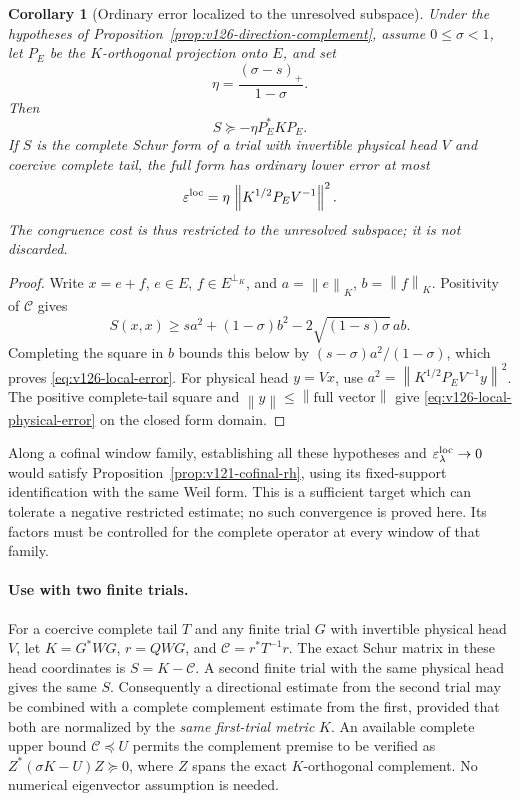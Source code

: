 \documentclass[11pt]{article}
\newtheorem{corollary}[theorem]{Corollary}
\theoremstyle{remark}
\newcommand{\norm}[1]{\left\lVert #1\right\rVert}
\begin{document}
\begin{corollary}[Ordinary error localized to the unresolved subspace]
\label{cor:v126-local-error}
Under the hypotheses of Proposition~\ref{prop:v126-direction-complement},
assume $0\le\sigma<1$, let $P_E$ be the $K$-orthogonal projection
onto $E$, and set
\[
 \eta=\frac{(\sigma-s)_+}{1-\sigma}.
\]
Then
\begin{equation}\label{eq:v126-local-error}
 S\succeq-\eta P_E^*KP_E.
\end{equation}
If $S$ is the complete Schur form of a trial with invertible
physical head $V$ and coercive complete tail, the full form has
ordinary lower error at most
\begin{equation}\label{eq:v126-local-physical-error}
 \varepsilon^{\rm loc}
 =\eta\,\norm{K^{1/2}P_EV^{-1}}^2.
\end{equation}
The congruence cost is thus restricted to the unresolved subspace;
it is not discarded.
\end{corollary}
\begin{proof}
Write $x=e+f$, $e\in E$, $f\in E^{\perp_K}$, and
$a=\norm e_K$, $b=\norm f_K$. Positivity of $\mathcal C$ gives
\[
 S(x,x)\ge sa^2+(1-\sigma)b^2
                 -2\sqrt{(1-s)\sigma}\,ab.
\]
Completing the square in $b$ bounds this below by
$(s-\sigma)a^2/(1-\sigma)$, which proves
\eqref{eq:v126-local-error}. For physical head $y=Vx$, use
$a^2=\norm{K^{1/2}P_EV^{-1}y}^2$. The positive complete-tail
square and $\norm y\le\norm{\text{full vector}}$ give
\eqref{eq:v126-local-physical-error} on the closed form domain.
\end{proof}

Along a cofinal window family, establishing all these hypotheses
and $\varepsilon^{\rm loc}_\lambda\to0$ would satisfy
Proposition~\ref{prop:v121-cofinal-rh}, using its fixed-support
identification with the same Weil form. This is a sufficient target
which can tolerate a negative restricted estimate; no such
convergence is proved here. Its factors must be controlled for
the complete operator at every window of that family.

\paragraph{Use with two finite trials.}
For a coercive complete tail $T$ and any finite trial $G$ with
invertible physical head $V$, let
$K=G^*WG$, $r=QWG$, and $\mathcal C=r^*T^{-1}r$.
The exact Schur matrix in these head coordinates is $S=K-\mathcal C$.
A second finite trial with the same physical head gives the same $S$.
Consequently a directional estimate from the second trial may be combined
with a complete complement estimate from the first, provided that both
are normalized by the \emph{same first-trial metric} $K$.
An available complete upper bound $\mathcal C\preceq U$ permits the
complement premise to be verified as
$Z^*(\sigma K-U)Z\succeq0$, where $Z$ spans the exact
$K$-orthogonal complement.  No numerical eigenvector assumption is needed.
\end{document}
